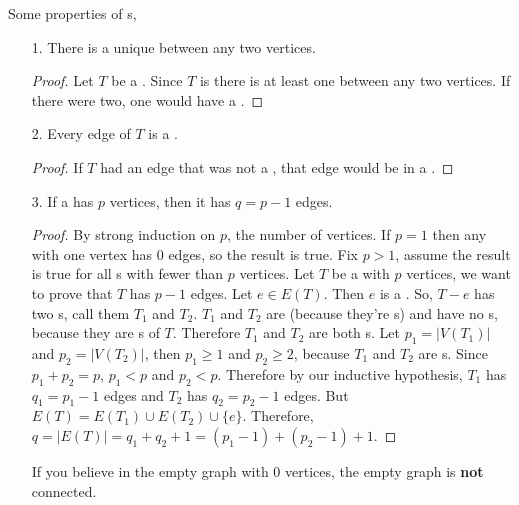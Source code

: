 \documentclass[english, 11pt]{article}
\begin{document}
Some properties of s,
\begin{itemize}
  \item[1.] There is a unique  between any two vertices.
  \begin{proof}
    Let $T$ be a . Since $T$ is  there is at least one  between any two vertices. If there were two, one would have a .
  \end{proof}
  \item[2.] Every edge of $T$ is a .
  \begin{proof}
    If $T$ had an edge that was not a , that edge would be in a .
  \end{proof}
  \item[3.] If a  has $p$ vertices, then it has $q = p - 1$ edges.
  \begin{proof}
    By strong induction on $p$, the number of vertices. If $p = 1$ then any  with one vertex has 0 edges, so the result is true. Fix $p > 1$, assume the result is true for all s with fewer than $p$ vertices. Let $T$ be a  with $p$ vertices, we want to prove that $T$ has $p - 1$ edges. Let $e \in E(T)$. Then $e$ is a . So, $T - e$ has two s, call them $T_1$ and $T_2$. $T_1$ and $T_2$ are  (because they're s) and have no s, because they are s of $T$. Therefore $T_1$ and $T_2$ are both s. Let $p_1 = |V(T_1)|$ and $p_2 = |V(T_2)|$, then $p_1 \geq 1$ and $p_2 \geq 2$, because $T_1$ and $T_2$ are s. Since $p_1 + p_2 = p$, $p_1 < p$ and $p_2 < p$. Therefore by our inductive hypothesis, $T_1$ has $q_1 = p_1 - 1$ edges and $T_2$ has $q_2 = p_2 - 1$ edges. But $E(T) = E(T_1) \cup E(T_2) \cup \{e\}$. Therefore, $q = |E(T)| = q_1 + q_2 + 1 = (p_1 - 1) + (p_2 - 1) + 1$.
  \end{proof}
  If you believe in the empty graph with 0 vertices, the empty graph is \textbf{not} connected.
\end{itemize}
\end{document}
